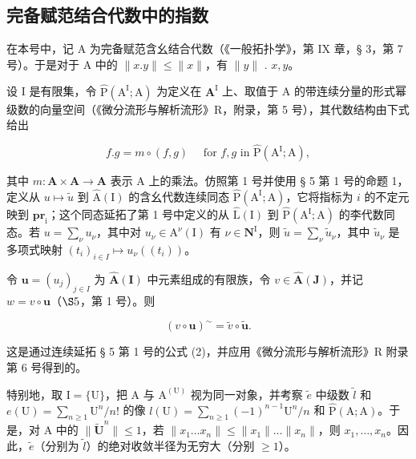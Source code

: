 \subsection{完备赋范结合代数中的指数}

在本号中，记 A 为完备赋范含幺结合代数（《一般拓扑学》，第 IX 章，§ 3，第 7 号）。于是对于 A 中的 \(\| x.y\| \leqslant \| x\|\)，有 \(\| y\|\) . \(x,y\)。

设 I 是有限集，令 \(\hat{\mathrm{P}} (\mathrm{A}^{\mathrm{I}};\mathrm{A})\) 为定义在 \(\mathbf{A}^{\mathrm{I}}\) 上、取值于 A 的带连续分量的形式幂级数的向量空间（《微分流形与解析流形》R，附录，第 5 号），其代数结构由下式给出

\[
f. g = m \circ (f, g) \quad \text { for } f, g \text { in } \hat {\mathrm{P}} (\mathrm{A} ^ {\mathrm{I}}; \mathrm{A}),
\]

其中 \(m: \mathbf{A} \times \mathbf{A} \to \mathbf{A}\) 表示 A 上的乘法。仿照第 1 号并使用 § 5 第 1 号的命题 1，定义从 \(u \mapsto \tilde{u}\) 到 \(\hat{\mathrm{A}}(\mathrm{I})\) 的含幺代数连续同态 \(\hat{\mathrm{P}}(\mathrm{A}^{\mathrm{I}}; \mathrm{A})\)，它将指标为 \(i\) 的不定元映到 \(\mathbf{pr}_{\mathrm{i}}\)；这个同态延拓了第 1 号中定义的从 \(\hat{\mathrm{L}}(\mathrm{I})\) 到 \(\hat{\mathrm{P}}(\mathrm{A}^{\mathrm{I}}; \mathrm{A})\) 的李代数同态。若 \(u = \sum_{\nu} u_{\nu}\)，其中对 \(u_{\nu} \in \mathrm{A}^{\nu}(\mathrm{I})\) 有 \(\nu \in \mathbf{N}^{\mathrm{I}}\)，则 \(\tilde{u} = \sum_{\nu} \tilde{u}_{\nu}\)，其中 \(\tilde{u}_{\nu}\) 是多项式映射 \((t_{i})_{i \in I} \mapsto u_{\nu}((t_{i}))\)。

令 \(\boldsymbol{u} = (u_{j})_{j \in I}\) 为 \(\hat{\mathbf{A}}(\mathbf{I})\) 中元素组成的有限族，令 \(v \in \hat{\mathbf{A}}(\mathbf{J})\)，并记 \(w = v \circ \boldsymbol{u}\)（\(\S 5\)，第 1 号）。则

\[
(v \circ \boldsymbol {u}) ^ {\sim} = \tilde {v} \circ \tilde {\boldsymbol {u}}.\tag{18}
\]

这是通过连续延拓 § 5 第 1 号的公式 (2)，并应用《微分流形与解析流形》R 附录第 6 号得到的。

特别地，取 \(\mathrm{I} = \{\mathrm{U}\}\)，把 A 与 \(\mathrm{A}^{(\mathrm{U})}\) 视为同一对象，并考察 \(\tilde{e}\) 中级数 \(\tilde{l}\) 和 \(e(\mathrm{U}) = \sum_{n\geqslant 1}\mathrm{U}^n /n!\) 的像 \(l(\mathrm{U}) = \sum_{n\geqslant 1}(-1)^{n - 1}\mathrm{U}^n /n\) 和 \(\hat{\mathrm{P}} (\mathrm{A};\mathrm{A})\)。于是，对 A 中的 \(\| \tilde{\mathbf{U}}^n\| \leqslant 1\)，若 \(\| x_1\dots x_n\| \leqslant \| x_1\| \dots \| x_n\|\)，则 \(x_{1},\ldots ,x_{n}\)。因此，\(\tilde{e}\)（分别为 \(\tilde{l}\)）的绝对收敛半径为无穷大（分别 \(\geqslant 1\)）。

